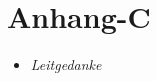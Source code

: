 \section{Anhang-C}
\vspace{1em}
\begin{tcolorbox}[title=Leitgedanke, didaktikbox]
	\begin{itemize}
		\item \emph{Leitgedanke} \dotfill\pageref{box:leitgedanke}
		
	\end{itemize}
\end{tcolorbox}